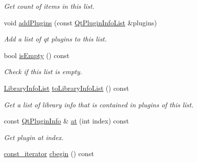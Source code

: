\begin{DoxyCompactItemize}
\begin{DoxyCompactList}\small\item\em Get count of items in this list. \end{DoxyCompactList}\item 
void \hyperlink{class_mdt_1_1_deploy_utils_1_1_qt_plugin_info_list_a42e65fcf0e458baad9b4ccea197a7db0}{add\+Plugins} (const \hyperlink{class_mdt_1_1_deploy_utils_1_1_qt_plugin_info_list}{Qt\+Plugin\+Info\+List} \&plugins)
\begin{DoxyCompactList}\small\item\em Add a list of qt plugins to this list. \end{DoxyCompactList}\item 
bool \hyperlink{class_mdt_1_1_deploy_utils_1_1_qt_plugin_info_list_a515008bd02241dacc804ee833cc40b23}{is\+Empty} () const \hypertarget{class_mdt_1_1_deploy_utils_1_1_qt_plugin_info_list_a515008bd02241dacc804ee833cc40b23}{}\label{class_mdt_1_1_deploy_utils_1_1_qt_plugin_info_list_a515008bd02241dacc804ee833cc40b23}

\begin{DoxyCompactList}\small\item\em Check if this list is empty. \end{DoxyCompactList}\item 
\hyperlink{class_mdt_1_1_deploy_utils_1_1_library_info_list}{Library\+Info\+List} \hyperlink{class_mdt_1_1_deploy_utils_1_1_qt_plugin_info_list_adde4d5034f738037645ba5e9f584495b}{to\+Library\+Info\+List} () const 
\begin{DoxyCompactList}\small\item\em Get a list of library info that is contained in plugins of this list. \end{DoxyCompactList}\item 
const \hyperlink{class_mdt_1_1_deploy_utils_1_1_qt_plugin_info}{Qt\+Plugin\+Info} \& \hyperlink{class_mdt_1_1_deploy_utils_1_1_qt_plugin_info_list_ad5328eb7e41eb01398a2e589620ebaf3}{at} (int index) const 
\begin{DoxyCompactList}\small\item\em Get plugin at {\itshape index}. \end{DoxyCompactList}\item 
\hyperlink{class_mdt_1_1_deploy_utils_1_1_qt_plugin_info_list_a53264e1e1de681739e375aea573ce2cf}{const\+\_\+iterator} \hyperlink{class_mdt_1_1_deploy_utils_1_1_qt_plugin_info_list_ab46a8ea38fd6c41f20b5931748d5cf5b}{cbegin} () const \hypertarget{class_mdt_1_1_deploy_utils_1_1_qt_plugin_info_list_ab46a8ea38fd6c41f20b5931748d5cf5b}{}\label{class_mdt_1_1_deploy_utils_1_1_qt_plugin_info_list_ab46a8ea38fd6c41f20b5931748d5cf5b}


\end{DoxyCompactItemize}
